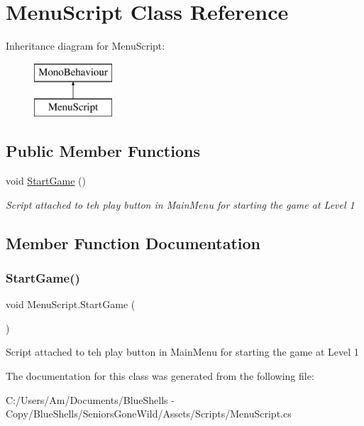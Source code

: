\hypertarget{class_menu_script}{}\section{Menu\+Script Class Reference}
\label{class_menu_script}
Inheritance diagram for Menu\+Script\+:\begin{figure}[H]
\begin{center}
\leavevmode
\includegraphics[height=2.000000cm]{class_menu_script}
\end{center}
\end{figure}
\subsection*{Public Member Functions}
\begin{DoxyCompactItemize}
\item 
void \mbox{\hyperlink{class_menu_script_a9347d5e7759ebceb5b1266faca8d336b}{Start\+Game}} ()
\begin{DoxyCompactList}\small\item\em Script attached to teh play button in Main\+Menu for starting the game at Level 1 \end{DoxyCompactList}\end{DoxyCompactItemize}


\subsection{Member Function Documentation}
\mbox{\label{class_menu_script_a9347d5e7759ebceb5b1266faca8d336b}} 
\subsubsection{\texorpdfstring{Start\+Game()}{StartGame()}}
{\footnotesize\ttfamily void Menu\+Script.\+Start\+Game (\begin{DoxyParamCaption}{ }\end{DoxyParamCaption})}



Script attached to teh play button in Main\+Menu for starting the game at Level 1 



The documentation for this class was generated from the following file\+:\begin{DoxyCompactItemize}
\item 
C\+:/\+Users/\+Am/\+Documents/\+Blue\+Shells -\/ Copy/\+Blue\+Shells/\+Seniors\+Gone\+Wild/\+Assets/\+Scripts/Menu\+Script.\+cs\end{DoxyCompactItemize}

